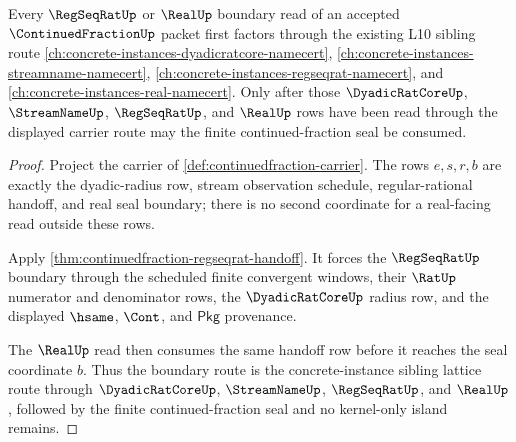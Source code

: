 \begin{theorem}
\label{thm:continuedfraction-l10-sibling-dependency-route}
Every $\RegSeqRatUp$ or $\RealUp$ boundary read of an accepted
$\ContinuedFractionUp$ packet first factors through the existing L10 sibling
route
\autoref{ch:concrete-instances-dyadicratcore-namecert},
\autoref{ch:concrete-instances-streamname-namecert},
\autoref{ch:concrete-instances-regseqrat-namecert}, and
\autoref{ch:concrete-instances-real-namecert}. Only after those
$\DyadicRatCoreUp$, $\StreamNameUp$, $\RegSeqRatUp$, and $\RealUp$ rows have
been read through the displayed carrier route may the finite continued-fraction
seal be consumed.
\end{theorem}
\begin{proof}
Project the carrier of \autoref{def:continuedfraction-carrier}. The rows
$e,s,r,b$ are exactly the dyadic-radius row, stream observation schedule,
regular-rational handoff, and real seal boundary; there is no second coordinate
for a real-facing read outside these rows.

Apply \autoref{thm:continuedfraction-regseqrat-handoff}. It forces the
$\RegSeqRatUp$ boundary through the scheduled finite convergent windows, their
$\RatUp$ numerator and denominator rows, the $\DyadicRatCoreUp$ radius row, and
the displayed $\hsame$, $\Cont$, and $\mathsf{Pkg}$ provenance.

The $\RealUp$ read then consumes the same handoff row before it reaches the
seal coordinate $b$. Thus the boundary route is the concrete-instance sibling
lattice route through $\DyadicRatCoreUp$, $\StreamNameUp$, $\RegSeqRatUp$, and
$\RealUp$, followed by the finite continued-fraction seal and no kernel-only
island remains.
\end{proof}

